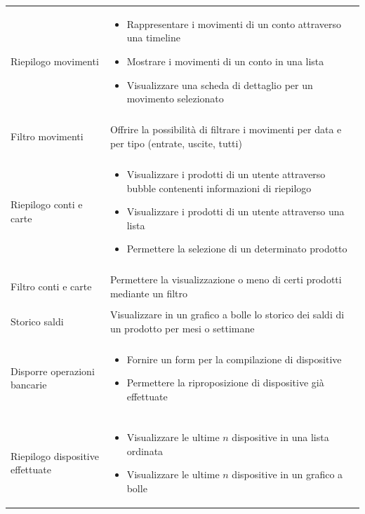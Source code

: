 \begin{center}
\begin{longtable}{p{6cm}|p{8cm}}
    Riepilogo movimenti & \begin{itemize}
                           \item Rappresentare i movimenti di un conto attraverso una timeline
                           \item Mostrare i movimenti di un conto in una lista
                           \item Visualizzare una scheda di dettaglio per un movimento selezionato
                          \end{itemize}\\\\
    Filtro movimenti & Offrire la possibilità di filtrare i movimenti per data e per tipo (entrate, uscite, tutti)\\\\
    Riepilogo conti e carte & \begin{itemize}
				\item Visualizzare i prodotti di un utente attraverso bubble contenenti informazioni di riepilogo
				\item Visualizzare i prodotti di un utente attraverso una lista
				\item Permettere la selezione di un determinato prodotto
                              \end{itemize}\\\\
    Filtro conti e carte & Permettere la visualizzazione o meno di certi prodotti mediante un filtro\\\\
    Storico saldi & Visualizzare in un grafico a bolle lo storico dei saldi di un prodotto per mesi o settimane \\\\
    Disporre operazioni bancarie & \begin{itemize}
				      \item Fornire un form per la compilazione di dispositive 
				      \item Permettere la riproposizione di dispositive già effettuate
				    \end{itemize}\\\\
    Riepilogo dispositive effettuate & \begin{itemize}
                                        \item Visualizzare le ultime $n$ dispositive in una lista ordinata
                                        \item Visualizzare le ultime $n$ dispositive in un grafico a bolle

\end{itemize}
\end{longtable}
\end{center}
